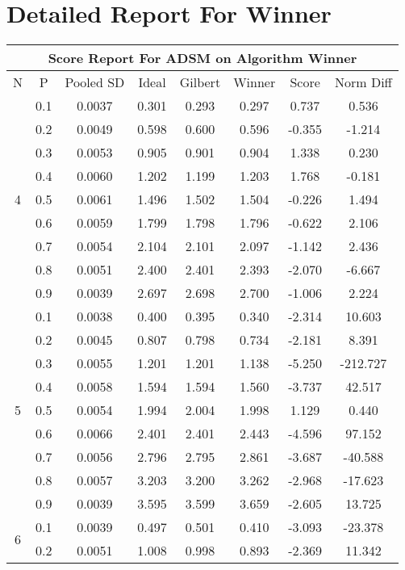 \documentclass[11pt,a4paper]{report}
\begin{document}
\chapter{Detailed Report For Winner}
\begin{longtable}{ | c | c || c | c | c | c | c | c | }
\hline
\multicolumn{8}{|c|}{ Score Report For ADSM on Algorithm Winner} \\
\hline
N & P & Pooled SD &  Ideal &  Gilbert & Winner  & Score & Norm Diff \\
 \hline
 \hline
 \endhead
\multirow{9}{*}{4} & 0.1 & 0.0037 & 0.301 & 0.293 & 0.297 & 0.737 & 0.536 \\
 & 0.2 & 0.0049 & 0.598 & 0.600 & 0.596 & -0.355 & -1.214 \\
 & 0.3 & 0.0053 & 0.905 & 0.901 & 0.904 & 1.338 & 0.230 \\
 & 0.4 & 0.0060 & 1.202 & 1.199 & 1.203 & 1.768 & -0.181 \\
 & 0.5 & 0.0061 & 1.496 & 1.502 & 1.504 & -0.226 & 1.494 \\
 & 0.6 & 0.0059 & 1.799 & 1.798 & 1.796 & -0.622 & 2.106 \\
 & 0.7 & 0.0054 & 2.104 & 2.101 & 2.097 & -1.142 & 2.436 \\
 & 0.8 & 0.0051 & 2.400 & 2.401 & 2.393 & -2.070 & -6.667 \\
 & 0.9 & 0.0039 & 2.697 & 2.698 & 2.700 & -1.006 & 2.224 \\
 \hline
\multirow{9}{*}{5} & 0.1 & 0.0038 & 0.400 & 0.395 & 0.340 & -2.314 & 10.603 \\
 & 0.2 & 0.0045 & 0.807 & 0.798 & 0.734 & -2.181 & 8.391 \\
 & 0.3 & 0.0055 & 1.201 & 1.201 & 1.138 & -5.250 & -212.727 \\
 & 0.4 & 0.0058 & 1.594 & 1.594 & 1.560 & -3.737 & 42.517 \\
 & 0.5 & 0.0054 & 1.994 & 2.004 & 1.998 & 1.129 & 0.440 \\
 & 0.6 & 0.0066 & 2.401 & 2.401 & 2.443 & -4.596 & 97.152 \\
 & 0.7 & 0.0056 & 2.796 & 2.795 & 2.861 & -3.687 & -40.588 \\
 & 0.8 & 0.0057 & 3.203 & 3.200 & 3.262 & -2.968 & -17.623 \\
 & 0.9 & 0.0039 & 3.595 & 3.599 & 3.659 & -2.605 & 13.725 \\
 \hline
\multirow{9}{*}{6} & 0.1 & 0.0039 & 0.497 & 0.501 & 0.410 & -3.093 & -23.378 \\
 & 0.2 & 0.0051 & 1.008 & 0.998 & 0.893 & -2.369 & 11.342 \\

\end{longtable}
\end{document}
